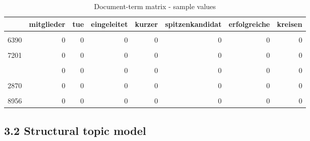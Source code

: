 \documentclass[
  12pt,
]{article}
\begin{document}
\begin{table}[H]

\caption{\label{tab:Document term matrix}Document-term matrix - sample values \label{table:dtm}}
\centering
\fontsize{7}{9}\selectfont
\begin{tabular}[t]{lrrrrrrr}
\toprule
  & mitglieder & tue & eingeleitet & kurzer & spitzenkandidat & erfolgreiche & kreisen\\
\midrule
\cellcolor{gray!6}{10835} & \cellcolor{gray!6}{0} & \cellcolor{gray!6}{0} & \cellcolor{gray!6}{0} & \cellcolor{gray!6}{0} & \cellcolor{gray!6}{0} & \cellcolor{gray!6}{0} & \cellcolor{gray!6}{0}\\
6390 & 0 & 0 & 0 & 0 & 0 & 0 & 0\\
\cellcolor{gray!6}{11194} & \cellcolor{gray!6}{0} & \cellcolor{gray!6}{0} & \cellcolor{gray!6}{0} & \cellcolor{gray!6}{0} & \cellcolor{gray!6}{0} & \cellcolor{gray!6}{0} & \cellcolor{gray!6}{0}\\
7201 & 0 & 0 & 0 & 0 & 0 & 0 & 0\\
\cellcolor{gray!6}{10889} & \cellcolor{gray!6}{1} & \cellcolor{gray!6}{0} & \cellcolor{gray!6}{0} & \cellcolor{gray!6}{0} & \cellcolor{gray!6}{0} & \cellcolor{gray!6}{0} & \cellcolor{gray!6}{0}\\
\addlinespace
615 & 0 & 0 & 0 & 0 & 0 & 0 & 0\\
\cellcolor{gray!6}{10604} & \cellcolor{gray!6}{0} & \cellcolor{gray!6}{0} & \cellcolor{gray!6}{0} & \cellcolor{gray!6}{0} & \cellcolor{gray!6}{0} & \cellcolor{gray!6}{0} & \cellcolor{gray!6}{0}\\
2870 & 0 & 0 & 0 & 0 & 0 & 0 & 0\\
\cellcolor{gray!6}{14155} & \cellcolor{gray!6}{0} & \cellcolor{gray!6}{0} & \cellcolor{gray!6}{0} & \cellcolor{gray!6}{0} & \cellcolor{gray!6}{0} & \cellcolor{gray!6}{0} & \cellcolor{gray!6}{0}\\
8956 & 0 & 0 & 0 & 0 & 0 & 0 & 0\\
\bottomrule
\end{tabular}
\end{table}

\hypertarget{structural-topic-model}{%
\subsection{3.2 Structural topic model}\label{structural-topic-model}}
\end{document}
